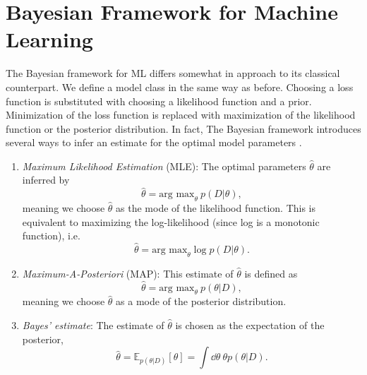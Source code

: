 \section{Bayesian Framework for Machine Learning}
The Bayesian framework for ML differs somewhat in approach to its classical counterpart.
We define a model class in the same way as before. Choosing a loss function is substituted with
choosing a likelihood function and a prior.
Minimization of the loss function is replaced with maximization of the likelihood function or the posterior distribution. In fact,
The Bayesian framework introduces several ways to infer an estimate for the optimal model parameters \cite{ml_for_physicists}.
\begin{enumerate}
    \item \textit{Maximum Likelihood Estimation} (MLE): The optimal parameters $\hat{\theta}$ are inferred by
    \begin{equation}\label{eq:mle}
        \hat{\theta} = \text{arg max}_\theta \ p(D|\theta),
    \end{equation}
    meaning we choose $\hat{\theta}$ as the mode of the likelihood function.
    This is equivalent to maximizing the log-likelihood (since log is a monotonic function), i.e.
    \begin{equation}\label{eq:map}
        \hat{\theta} = \text{arg max}_\theta \log p(D|\theta).
    \end{equation}
    \item \textit{Maximum-A-Posteriori} (MAP): This estimate of $\hat{\theta}$ is defined as
    \begin{equation}
        \hat{\theta} = \text{arg max}_\theta \ p(\theta|D),
    \end{equation}
    meaning we choose $\hat{\theta}$ as a mode of the posterior distribution.
    \item \textit{Bayes' estimate}: The estimate of $\hat{\theta}$ is chosen as the expectation of the posterior,
    \begin{equation}
        \hat{\theta} = \mathbb{E}_{p(\theta|D)}[\theta] = \int \dd \theta \ \theta p(\theta|D).
    \end{equation}
\end{enumerate}

